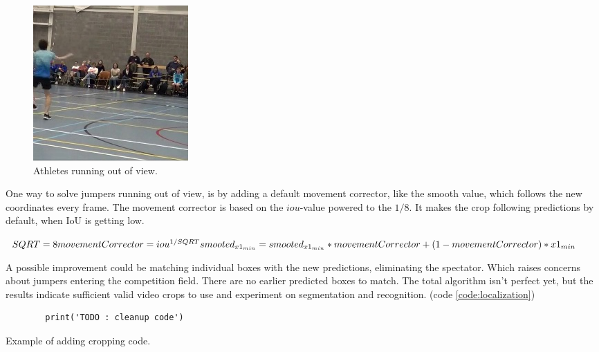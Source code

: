 
\begin{figure}
    \centering
    \includegraphics[width=0.45\linewidth]{img/1241_1093_cropped}
    \caption[dd3-crop-error]{Athletes running out of view.}
    \label{fig:dd3-crop-error-out-of-view}
\end{figure}

One way to solve jumpers running out of view, is by adding a default movement corrector, like the smooth value, which follows the new coordinates every frame. The movement corrector is based on the \(iou\)-value powered to the \(1/8\). It makes the crop following predictions by default, when IoU is getting low.

\medskip

\begin{math}
    SQRT = 8 \\
    movementCorrector = iou^{1/SQRT} \\
    smooted_{x1_{min}} = smooted_{x1_{min}} * movementCorrector + (1 - movementCorrector) * {x1_{min}}
\end{math}

\medskip

A possible improvement could be matching individual boxes with the new predictions, eliminating the spectator. Which raises concerns about jumpers entering the competition field. There are no earlier predicted boxes to match.
The total algorithm isn't perfect yet, but the results indicate sufficient valid video crops to use and experiment on segmentation and recognition. (code \ref{code:localization})

\begin{listing}
    \begin{verbatim}
        print('TODO : cleanup code')
    \end{verbatim}
    \caption[Example codefragment]{Example of adding cropping code.}
    \label{code:localization}
\end{listing}

